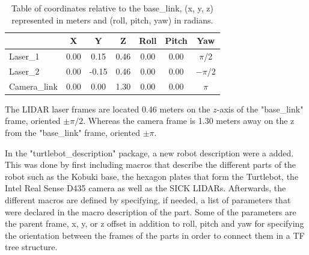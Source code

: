 \begin{table}[H]
\centering
\begin{tabular}{@{}l|c|c|c|c|c|c|@{}}
\cline{2-5}
& \cellcolor[HTML]{DBDBDB}X & \cellcolor[HTML]{DBDBDB}Y & \cellcolor[HTML]{DBDBDB}Z & \cellcolor[HTML]{DBDBDB}Roll & \cellcolor[HTML]{DBDBDB}Pitch & \cellcolor[HTML]{DBDBDB}Yaw \\ \hline
\multicolumn{1}{|l|}{\cellcolor[HTML]{DBDBDB}Laser\_1} & 0.00 & 0.15 & 0.46 & 0.00 & 0.00 & $\pi$/2\\ \hline
\multicolumn{1}{|l|}{\cellcolor[HTML]{DBDBDB}Laser\_2} & 0.00 & -0.15 & 0.46 & 0.00 & 0.00 & $-\pi$/2\\ \hline
\multicolumn{1}{|l|}{\cellcolor[HTML]{DBDBDB}Camera\_link} & 0.00 & 0.00 & 1.30 & 0.00 & 0.00 & $\pi$\\ \hline
\end{tabular}
\caption{Table of coordinates relative to the base\_link, (x, y, z) represented in meters and (roll, pitch, yaw) in radians.}
\label{fig:coordiantetable}
\end{table}


The LIDAR laser frames are located 0.46 meters on the $z$-axis of the "base\_link" frame, oriented $\pm \pi/2$. Whereas the camera frame is 1.30 meters away on the z from the "base\_link" frame, oriented $\pm \pi$.

In the "turtlebot\_description" package, a new robot description were a added. This was done by first including macros that describe the different parts of the robot such as the Kobuki base, the hexagon plates that form the Turtlebot, the Intel Real Sense D435 camera as well as the SICK LIDARs. Afterwards, the different macros are defined by specifying, if needed, a list of parameters that were declared in the macro description of the part. Some of the parameters are the parent frame, x, y, or z offset in addition to roll, pitch and yaw for specifying the orientation between the frames of the parts in order to connect them in a TF tree structure.